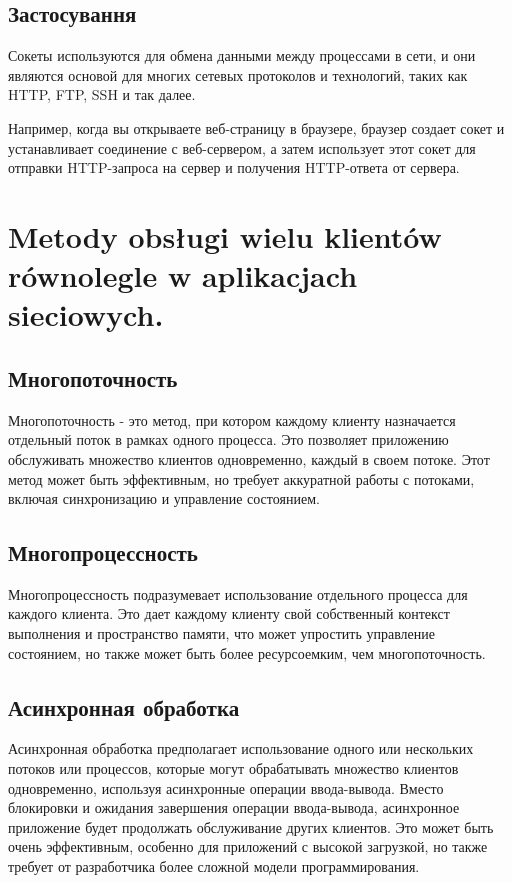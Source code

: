 \subsection*{Застосування}

Сокеты используются для обмена данными между процессами в сети, и они являются основой для многих сетевых протоколов и технологий, таких как HTTP, FTP, SSH и так далее.

Например, когда вы открываете веб-страницу в браузере, браузер создает сокет и устанавливает соединение с веб-сервером, а затем использует этот сокет для отправки HTTP-запроса на сервер и получения HTTP-ответа от сервера.


\section{Metody obsługi wielu klientów równolegle w aplikacjach sieciowych.}


\subsection*{Многопоточность}

Многопоточность - это метод, при котором каждому клиенту назначается отдельный поток в рамках одного процесса. Это позволяет приложению обслуживать множество клиентов одновременно, каждый в своем потоке. Этот метод может быть эффективным, но требует аккуратной работы с потоками, включая синхронизацию и управление состоянием.

\subsection*{Многопроцессность}

Многопроцессность подразумевает использование отдельного процесса для каждого клиента. Это дает каждому клиенту свой собственный контекст выполнения и пространство памяти, что может упростить управление состоянием, но также может быть более ресурсоемким, чем многопоточность.

\subsection*{Асинхронная обработка}

Асинхронная обработка предполагает использование одного или нескольких потоков или процессов, которые могут обрабатывать множество клиентов одновременно, используя асинхронные операции ввода-вывода. Вместо блокировки и ожидания завершения операции ввода-вывода, асинхронное приложение будет продолжать обслуживание других клиентов. Это может быть очень эффективным, особенно для приложений с высокой загрузкой, но также требует от разработчика более сложной модели программирования.


